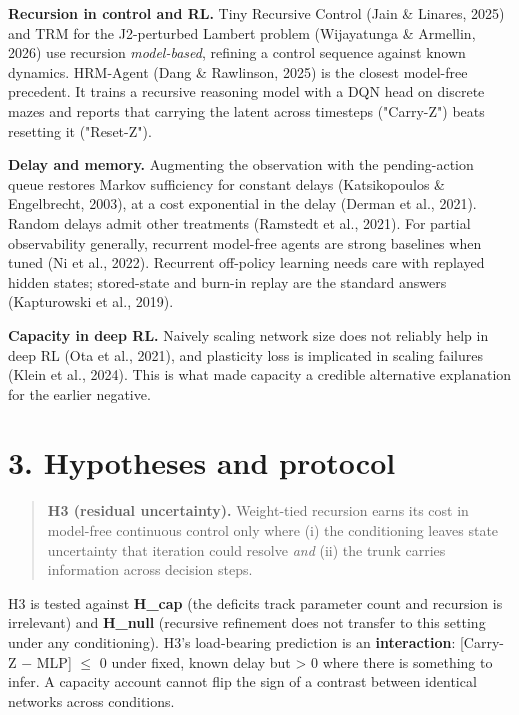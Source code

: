 \documentclass[11pt]{article}
\begin{document}
\textbf{Recursion in control and RL.} Tiny Recursive Control (Jain \& Linares, 2025) and TRM for the J2-perturbed Lambert problem (Wijayatunga \& Armellin, 2026) use recursion \emph{model-based}, refining a control sequence against known dynamics. HRM-Agent (Dang \& Rawlinson, 2025) is the closest model-free precedent. It trains a recursive reasoning model with a DQN head on discrete mazes and reports that carrying the latent across timesteps ("Carry-Z") beats resetting it ("Reset-Z").



\textbf{Delay and memory.} Augmenting the observation with the pending-action queue restores Markov sufficiency for constant delays (Katsikopoulos \& Engelbrecht, 2003), at a cost exponential in the delay (Derman et al., 2021). Random delays admit other treatments (Ramstedt et al., 2021). For partial observability generally, recurrent model-free agents are strong baselines when tuned (Ni et al., 2022). Recurrent off-policy learning needs care with replayed hidden states; stored-state and burn-in replay are the standard answers (Kapturowski et al., 2019).



\textbf{Capacity in deep RL.} Naively scaling network size does not reliably help in deep RL (Ota et al., 2021), and plasticity loss is implicated in scaling failures (Klein et al., 2024). This is what made capacity a credible alternative explanation for the earlier negative.



\section*{3. Hypotheses and protocol}



\begin{quote}\textbf{H3 (residual uncertainty).} Weight-tied recursion earns its cost in model-free continuous control only where (i) the conditioning leaves state uncertainty that iteration could resolve \emph{and} (ii) the trunk carries information across decision steps.\end{quote}



H3 is tested against \textbf{H\_cap} (the deficits track parameter count and recursion is irrelevant) and \textbf{H\_null} (recursive refinement does not transfer to this setting under any conditioning). H3's load-bearing prediction is an \textbf{interaction}: [Carry-Z $-$ MLP] $\leq$ 0 under fixed, known delay but > 0 where there is something to infer. A capacity account cannot flip the sign of a contrast between identical networks across conditions.
\end{document}
